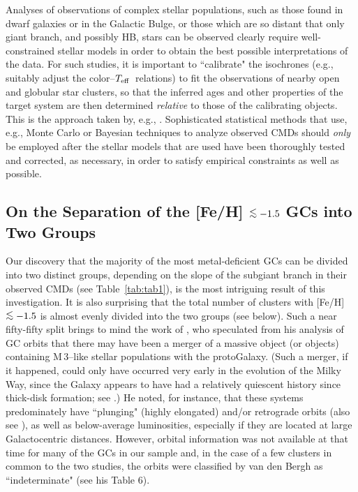 \documentclass[12pt,preprint]{aastex}
\newcommand\teff{{T_{\rm eff}}}
\newcommand\lta{\mathrel{\hbox{\raise 0.6 ex \hbox{$<$}\kern
                   -1.8 ex\lower .5 ex\hbox{$\sim$}}}}
\begin{document}
Analyses of observations of complex stellar populations, such as those found in
dwarf galaxies or in the Galactic Bulge, or those which are so distant that only
giant branch, and possibly HB, stars can be observed clearly require
well-constrained stellar models in order to obtain the best possible
interpretations of the data.  For such studies, it is important to ``calibrate"
the isochrones (e.g., suitably adjust the color--$\teff$\ relations) to fit the
observations of nearby open and globular star clusters, so that the inferred
ages and other properties of the target system are then determined {\it
relative} to those of the calibrating objects.  This is the approach taken by,
e.g., \citet{brfs04}.  Sophisticated statistical methods that use, e.g., Monte
Carlo or Bayesian techniques to analyze observed CMDs should {\it only} be
employed after the stellar models that are used have been thoroughly tested and
corrected, as necessary, in order to satisfy empirical constraints as well as
possible.


\subsection{On the Separation of the [Fe/H] $\lta -1.5$ GCs into Two Groups}
\label{subsec:twogcs}

Our discovery that the majority of the most metal-deficient GCs can be divided
into two distinct groups, depending on the slope of the subgiant branch in their
observed CMDs (see Table~\ref{tab:tab1}), is the most intriguing result of this
investigation. It is also surprising that the total number of clusters with
[Fe/H] $\lta -1.5$ is almost evenly divided into the two groups (see below).
Such a near fifty-fifty split
brings to mind the work of \citet{vsid93}, who speculated from his analysis of
GC orbits that there may have been a merger of a massive object (or objects)
containing M$\,$3--like stellar populations with the protoGalaxy.  (Such a
merger, if it happened, could only have occurred very early in the evolution of
the Milky Way, since the Galaxy appears to have had a relatively quiescent
history since thick-disk formation; see \citealt{hpc07}.)  He noted, for
instance, that these systems predominately have ``plunging" (highly elongated)
and/or retrograde orbits (also see \citealt{rp84}), as well as below-average
luminosities, especially if they are located at large Galactocentric distances.
However, orbital information was not available at that time for many of the GCs
in our sample and, in the case of a few clusters in common to the two studies,
the orbits were classified by van den Bergh as ``indeterminate" (see his Table
6).
\end{document}
